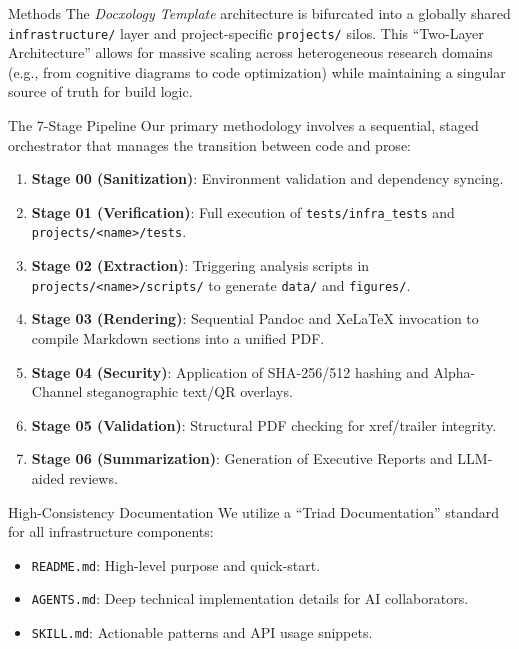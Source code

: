 \documentclass[
  ignorenonframetext,
]{beamer}
\author{\texorpdfstring{}{}}
\date{}
\providecommand{\tightlist}{%
  \setlength{\itemsep}{0pt}\setlength{\parskip}{0pt}}
\begin{document}
\begin{frame}[fragile]{Methods}
\protect{}\label{methods}
The \emph{Docxology Template} architecture is bifurcated into a globally
shared \texttt{infrastructure/} layer and project-specific
\texttt{projects/} silos. This ``Two-Layer Architecture'' allows for
massive scaling across heterogeneous research domains (e.g., from
cognitive diagrams to code optimization) while maintaining a singular
source of truth for build logic.

\begin{block}{The 7-Stage Pipeline}
\protect{}\label{the-7-stage-pipeline}
Our primary methodology involves a sequential, staged orchestrator that
manages the transition between code and prose:

\begin{enumerate}
\tightlist
\item
  \textbf{Stage 00 (Sanitization)}: Environment validation and
  dependency syncing.
\item
  \textbf{Stage 01 (Verification)}: Full execution of
  \texttt{tests/infra\_tests} and
  \texttt{projects/\textless{}name\textgreater{}/tests}.
\item
  \textbf{Stage 02 (Extraction)}: Triggering analysis scripts in
  \texttt{projects/\textless{}name\textgreater{}/scripts/} to generate
  \texttt{data/} and \texttt{figures/}.
\item
  \textbf{Stage 03 (Rendering)}: Sequential Pandoc and XeLaTeX
  invocation to compile Markdown sections into a unified PDF.
\item
  \textbf{Stage 04 (Security)}: Application of SHA-256/512 hashing and
  Alpha-Channel steganographic text/QR overlays.
\item
  \textbf{Stage 05 (Validation)}: Structural PDF checking for
  xref/trailer integrity.
\item
  \textbf{Stage 06 (Summarization)}: Generation of Executive Reports and
  LLM-aided reviews.
\end{enumerate}
\end{block}

\begin{block}{High-Consistency Documentation}
\protect{}\label{high-consistency-documentation}
We utilize a ``Triad Documentation'' standard for all infrastructure
components:

\begin{itemize}
\tightlist
\item
  \texttt{README.md}: High-level purpose and quick-start.
\item
  \texttt{AGENTS.md}: Deep technical implementation details for AI
  collaborators.
\item
  \texttt{SKILL.md}: Actionable patterns and API usage snippets.
\end{itemize}
\end{block}
\end{frame}
\end{document}
